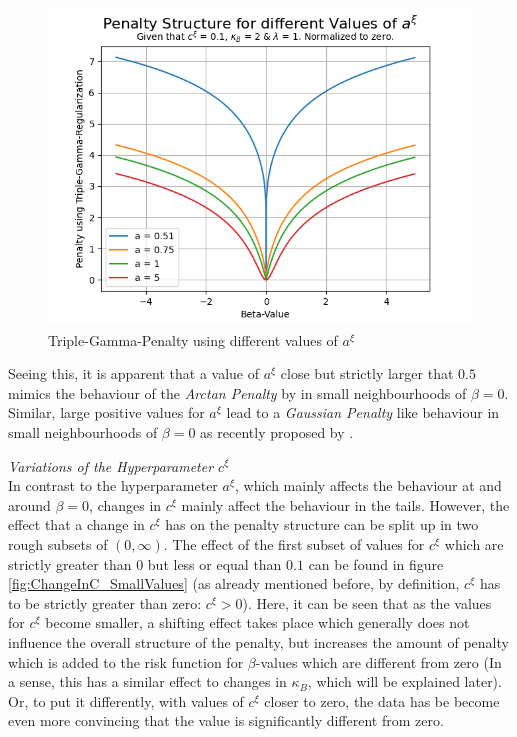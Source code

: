 \documentclass[12pt,a4paper]{article}
\begin{document}
\begin{figure}[h!]
\centering
\includegraphics[scale=0.75]{../02_simulation/021_simulation_figures/TGPenalty_ChangeInA.png}
\caption{Triple-Gamma-Penalty using different values of $a^\xi$}
\label{fig:VariationInA}
\end{figure}

Seeing this, it is apparent that a value of $a^\xi$ close but strictly larger that $0.5$ mimics the behaviour of the \textit{Arctan Penalty} by \textcite{WangZhu2016} in small neighbourhoods of $\beta=0$. Similar, large positive values for $a^\xi$ lead to a \textit{Gaussian Penalty} like behaviour in small neighbourhoods of $\beta = 0$ as recently proposed by \textcite{JohnVettamWu2022}.\\
\newpage

\textit{Variations of the Hyperparameter $c^\xi$}\\

In contrast to the hyperparameter $a^\xi$, which mainly affects the behaviour at and around $\beta=0$, changes in $c^\xi$ mainly affect the behaviour in the tails. However, the effect that a change in $c^\xi$ has on the penalty structure can be split up in two rough subsets of $(0,\infty)$. The effect of the first subset of values for $c^\xi$ which are strictly greater than $0$ but less or equal than $0.1$ can be found in figure \ref{fig:ChangeInC_SmallValues} (as already mentioned before, by definition, $c^\xi$ has to be strictly greater than zero: $c^\xi > 0$). Here, it can be seen that as the values for $c^\xi$ become smaller, a shifting effect takes place which generally does not influence the overall structure of the penalty, but increases the amount of penalty which is added to the risk function for $\beta$-values which are different from zero (In a sense, this has a similar effect to changes in $\kappa_B$, which will be explained later). Or, to put it differently, with values of $c^\xi$ closer to zero, the data has be become even more convincing that the value is significantly different from zero.\\
\end{document}
